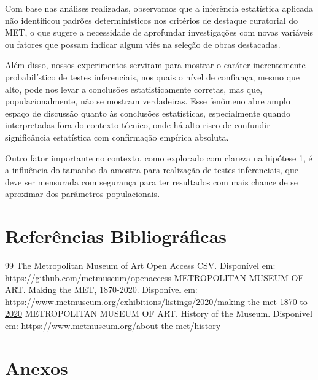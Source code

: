 \documentclass[11pt,a4paper]{article}
\begin{document}
Com base nas análises realizadas, observamos que a inferência estatística aplicada não identificou padrões determinísticos nos critérios de destaque curatorial do MET, o que sugere a necessidade de aprofundar investigações com novas variáveis ou fatores que possam indicar algum viés na seleção de obras destacadas.

Além disso, nossos experimentos serviram para mostrar o caráter inerentemente probabilístico de testes inferenciais, nos quais o nível de confiança, mesmo que alto, pode nos levar a conclusões estatisticamente corretas, mas que, populacionalmente, não se mostram verdadeiras. Esse fenômeno abre amplo espaço de discussão quanto às conclusões estatísticas, especialmente quando interpretadas fora do contexto técnico, onde há alto risco de confundir significância estatística com confirmação empírica absoluta.

Outro fator importante no contexto, como explorado com clareza na hipótese 1, é a influência do tamanho da amostra para realização de testes inferenciais, que deve ser mensurada com segurança para ter resultados com mais chance de se aproximar dos parâmetros populacionais.


\newpage
\section*{Referências Bibliográficas}
\begin{thebibliography}{99}
   The Metropolitan Museum of Art Open Access CSV. Disponível em: \url{https://github.com/metmuseum/openaccess}
   METROPOLITAN MUSEUM OF ART. Making the MET, 1870-2020. Disponível em: \url{https://www.metmuseum.org/exhibitions/listings/2020/making-the-met-1870-to-2020}
   METROPOLITAN MUSEUM OF ART. History of the Museum. Disponível em: \url{https://www.metmuseum.org/about-the-met/history}
\end{thebibliography}

\appendix
\section{Anexos}
\end{document}
